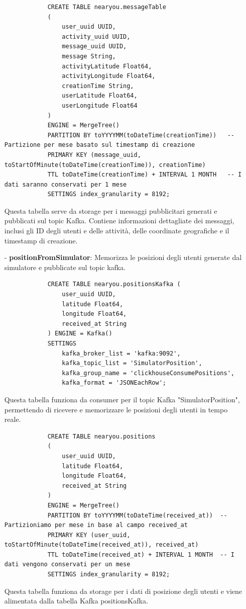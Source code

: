 \documentclass[10pt]{article}
\begin{document}
\begin{itemize}
            \begin{lstlisting}
            CREATE TABLE nearyou.messageTable
            (
                user_uuid UUID,
                activity_uuid UUID,
                message_uuid UUID,
                message String,
                activityLatitude Float64,
                activityLongitude Float64,
                creationTime String,
                userLatitude Float64,
                userLongitude Float64
            )
            ENGINE = MergeTree()
            PARTITION BY toYYYYMM(toDateTime(creationTime))   -- Partizione per mese basato sul timestamp di creazione
            PRIMARY KEY (message_uuid, toStartOfMinute(toDateTime(creationTime)), creationTime)
            TTL toDateTime(creationTime) + INTERVAL 1 MONTH   -- I dati saranno conservati per 1 mese
            SETTINGS index_granularity = 8192;
            \end{lstlisting}
            Questa tabella serve da storage per i messaggi pubblicitari generati e pubblicati sul topic Kafka. Contiene informazioni dettagliate dei messaggi, inclusi gli ID degli utenti e delle attività, delle coordinate geografiche e il timestamp di creazione.

            \item[-] \textbf{positionFromSimulator}: Memorizza le posizioni degli utenti generate dal simulatore e pubblicate sul topic kafka.
            \begin{lstlisting}
            CREATE TABLE nearyou.positionsKafka (
                user_uuid UUID,
                latitude Float64,
                longitude Float64,
                received_at String
            ) ENGINE = Kafka()
            SETTINGS 
                kafka_broker_list = 'kafka:9092',
                kafka_topic_list = 'SimulatorPosition',
                kafka_group_name = 'clickhouseConsumePositions',
                kafka_format = 'JSONEachRow';
            \end{lstlisting}
            Questa tabella funziona da consumer per il topic Kafka "SimulatorPosition", permettendo di ricevere e memorizzare le posizioni degli utenti in tempo reale.
            
            \begin{lstlisting}
            CREATE TABLE nearyou.positions
            (
                user_uuid UUID,
                latitude Float64,
                longitude Float64,
                received_at String
            )
            ENGINE = MergeTree()
            PARTITION BY toYYYYMM(toDateTime(received_at))  -- Partizioniamo per mese in base al campo received_at
            PRIMARY KEY (user_uuid, toStartOfMinute(toDateTime(received_at)), received_at)
            TTL toDateTime(received_at) + INTERVAL 1 MONTH  -- I dati vengono conservati per un mese
            SETTINGS index_granularity = 8192;
            \end{lstlisting}
            Questa tabella funziona da storage per i dati di posizione degli utenti e viene alimentata dalla tabella Kafka positionsKafka.


\end{itemize}
\end{document}
